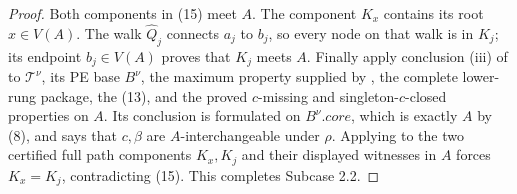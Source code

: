 \begin{proof}
Both components in (15) meet $A$.  The component $K_x$ contains its root
$x\in V(A)$.  The walk $\widehat Q_j$ connects $a_j$ to $b_j$, so every node on
that walk is in $K_j$; its endpoint $b_j\in V(A)$ proves that $K_j$ meets
$A$.  Finally apply conclusion (iii) of  to
$\mathcal T^\nu$, its PE base $B^\nu$, the maximum property supplied by
, the complete lower-rung package, the
 (13), and the proved $c$-missing and
singleton-$c$-closed properties on $A$.  Its conclusion is formulated on
$B^\nu.\mathit{core}$, which is exactly $A$ by (8), and says that
$c,\beta$ are $A$-interchangeable under $\rho$.  Applying
 to the two certified full path components
$K_x,K_j$ and their displayed witnesses in $A$ forces $K_x=K_j$,
contradicting (15).  This completes Subcase 2.2.
\end{proof}
